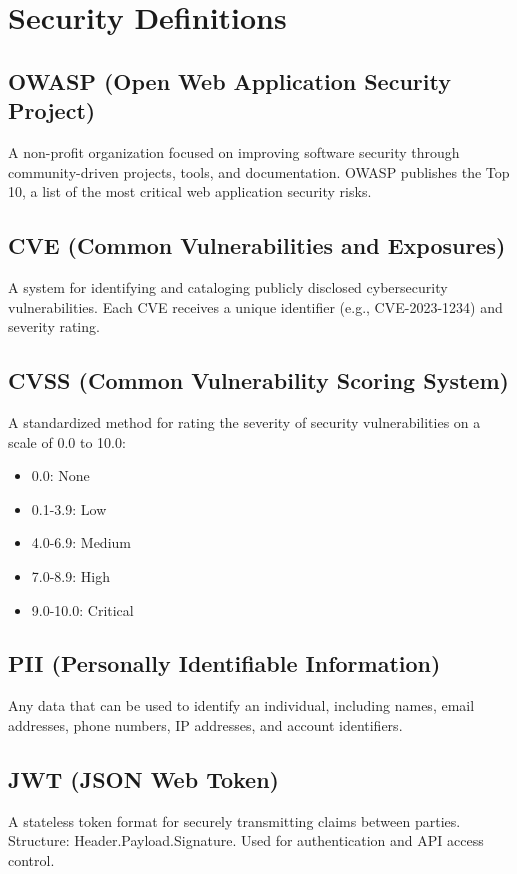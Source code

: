 \documentclass{report}
\begin{document}
\section{Security Definitions}

\subsection{OWASP (Open Web Application Security Project)}
A non-profit organization focused on improving software security through community-driven projects, tools, and documentation. OWASP publishes the Top 10, a list of the most critical web application security risks.

\subsection{CVE (Common Vulnerabilities and Exposures)}
A system for identifying and cataloging publicly disclosed cybersecurity vulnerabilities. Each CVE receives a unique identifier (e.g., CVE-2023-1234) and severity rating.

\subsection{CVSS (Common Vulnerability Scoring System)}
A standardized method for rating the severity of security vulnerabilities on a scale of 0.0 to 10.0:
\begin{itemize}
\item 0.0: None
\item 0.1-3.9: Low
\item 4.0-6.9: Medium
\item 7.0-8.9: High
\item 9.0-10.0: Critical
\end{itemize}

\subsection{PII (Personally Identifiable Information)}
Any data that can be used to identify an individual, including names, email addresses, phone numbers, IP addresses, and account identifiers.

\subsection{JWT (JSON Web Token)}
A stateless token format for securely transmitting claims between parties. Structure: Header.Payload.Signature. Used for authentication and API access control.
\end{document}

